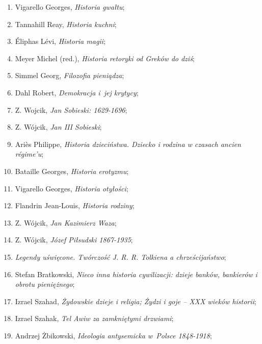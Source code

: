 \documentclass[a4paper,11pt]{article}
\begin{document}
\begin{enumerate}
\item Vigarello Georges, \textit{Historia gwałtu};

\item Tannahill Reay, \textit{Historia kuchni};

\item Éliphas Lévi, \textit{Historia magii};

\item Meyer Michel (red.), \textit{Historia retoryki od Greków do dziś};

\item Simmel Georg, \textit{Filozofia pieniądza};

\item Dahl Robert, \textit{Demokracja i~jej krytycy};

\item Z. Wojcik, \textit{Jan Sobieski: 1629-1696};

\item Z. Wójcik, \textit{Jan III Sobieski};

\item Ariès Philippe, \textit{Historia dzieciństwa. Dziecko i rodzina w
    czasach ancien régime’u};

\item Bataille Georges, \textit{Historia erotyzmu};

\item Vigarello Georges, \textit{Historia otyłości};

\item Flandrin Jean-Louis, \textit{Historia rodziny};

\item Z. Wójcik, \textit{Jan Kazimierz Waza};

\item Z. Wójcik, \textit{Józef Piłsudski 1867-1935};

\item \textit{Legendy uświęcone. Twórczość J. R. R. Tolkiena a
    chrześcijaństwo};

\item Stefan Bratkowski, \textit{Nieco inna historia cywilizacji: dzieje
    banków, bankierów i obrotu pieniężnego};

\item Izrael Szahad, \textit{Żydowskie dzieje i religia; Żydzi i goje –
    XXX wieków historii};

\item Izrael Szahak, \textit{Tel Awiw za zamkniętymi drzwiami};

\item Andrzej Żbikowski, \textit{Ideologia antysemicka w~Polsce
    1848-1918};


\end{enumerate}
\end{document}
